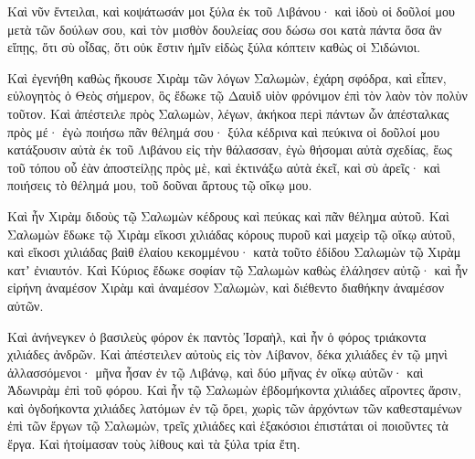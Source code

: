 {Καὶ νῦν ἔντειλαι, καὶ κοψάτωσάν μοι ξύλα ἐκ τοῦ Λιβάνου· καὶ ἰδοὺ οἱ δοῦλοί μου μετὰ τῶν δούλων σου, καὶ τὸν μισθὸν δουλείας σου δώσω σοι κατὰ πάντα ὅσα ἂν εἴπῃς, ὅτι σὺ οἶδας, ὅτι οὐκ ἔστιν ἡμῖν εἰδὼς ξύλα κόπτειν καθὼς οἱ Σιδώνιοι.
\par }{\PP {}Καὶ ἐγενήθη καθὼς ἤκουσε Χιρὰμ τῶν λόγων Σαλωμὼν, ἐχάρη σφόδρα, καὶ εἶπεν, εὐλογητὸς ὁ Θεὸς σήμερον, ὃς ἔδωκε τῷ Δαυὶδ υἱὸν φρόνιμον ἐπὶ τὸν λαὸν τὸν πολὺν τοῦτον.
Καὶ ἀπέστειλε πρὸς Σαλωμὼν, λέγων, ἀκήκοα περὶ πάντων ὧν ἀπέσταλκας πρὸς μέ· ἐγὼ ποιήσω πᾶν θέλημά σου· ξύλα κέδρινα καὶ πεύκινα
οἱ δοῦλοί μου κατάξουσιν αὐτὰ ἐκ τοῦ Λιβάνου εἰς τὴν θάλασσαν, ἐγὼ θήσομαι αὐτὰ σχεδίας, ἕως τοῦ τόπου οὗ ἐὰν ἀποστείλῃς πρὸς μὲ, καὶ ἐκτινάξω αὐτὰ ἐκεῖ, καὶ σὺ ἀρεῖς· καὶ ποιήσεις τὸ θέλημά μου, τοῦ δοῦναι ἄρτους τῷ οἴκῳ μου.
\par }{\PP {}Καὶ ἦν Χιρὰμ διδοὺς τῷ Σαλωμὼν κέδρους καὶ πεύκας καὶ πᾶν θέλημα αὐτοῦ.
Καὶ Σαλωμὼν ἔδωκε τῷ Χιρὰμ εἴκοσι χιλιάδας κόρους πυροῦ καὶ μαχεὶρ τῷ οἴκῳ αὐτοῦ, καὶ εἴκοσι χιλιάδας βαὶθ ἐλαίου κεκομμένου· κατὰ τοῦτο ἐδίδου Σαλωμὼν τῷ Χιρὰμ κατʼ ἐνιαυτόν.
Καὶ Κύριος ἔδωκε σοφίαν τῷ Σαλωμὼν καθὼς ἐλάλησεν αὐτῷ· καὶ ἦν εἰρήνη ἀναμέσον Χιρὰμ καὶ ἀναμέσον Σαλωμὼν, καὶ διέθεντο διαθήκην ἀναμέσον αὐτῶν.
\par }{\PP {}Καὶ ἀνήνεγκεν ὁ βασιλεὺς φόρον ἐκ παντὸς Ἰσραὴλ, καὶ ἦν ὁ φόρος τριάκοντα χιλιάδες ἀνδρῶν.
Καὶ ἀπέστειλεν αὐτοὺς εἰς τὸν Λίβανον, δέκα χιλιάδες ἐν τῷ μηνὶ ἀλλασσόμενοι· μῆνα ἦσαν ἐν τῷ Λιβάνῳ, καὶ δύο μῆνας ἐν οἴκῳ αὐτῶν· καὶ Ἀδωνιρὰμ ἐπὶ τοῦ φόρου.
Καὶ ἦν τῷ Σαλωμὼν ἑβδομήκοντα χιλιάδες αἴροντες ἄρσιν, καὶ ὀγδοήκοντα χιλιάδες λατόμων ἐν τῷ ὄρει,
χωρὶς τῶν ἀρχόντων τῶν καθεσταμένων ἐπὶ τῶν ἔργων τῷ Σαλωμὼν, τρεῖς χιλιάδες καὶ ἑξακόσιοι ἐπιστάται οἱ ποιοῦντες τὰ ἔργα.
Καὶ ἡτοίμασαν τοὺς λίθους καὶ τὰ ξύλα τρία ἔτη.

}
